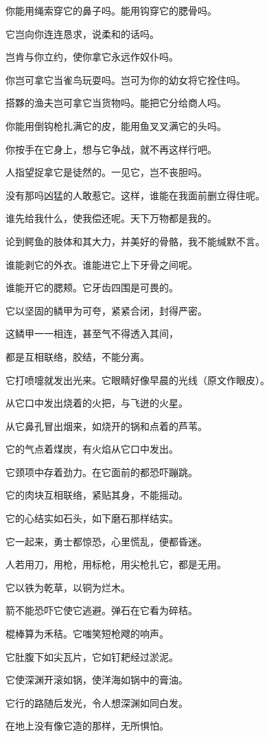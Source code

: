 \documentclass[12pt,oneside]{book}
\begin{document}
你能用绳索穿它的鼻子吗。能用钩穿它的腮骨吗。

它岂向你连连恳求，说柔和的话吗。

岂肯与你立约，使你拿它永远作奴仆吗。

你岂可拿它当雀鸟玩耍吗。岂可为你的幼女将它拴住吗。

搭夥的渔夫岂可拿它当货物吗。能把它分给商人吗。

你能用倒钩枪扎满它的皮，能用鱼叉叉满它的头吗。

你按手在它身上，想与它争战，就不再这样行吧。

人指望捉拿它是徒然的。一见它，岂不丧胆吗。

没有那吗凶猛的人敢惹它。这样，谁能在我面前删立得住呢。

谁先给我什么，使我偿还呢。天下万物都是我的。

论到鳄鱼的肢体和其大力，并美好的骨骼，我不能缄默不言。

谁能剥它的外衣。谁能进它上下牙骨之间呢。

谁能开它的腮颊。它牙齿四围是可畏的。

它以坚固的鳞甲为可夸，紧紧合闭，封得严密。

这鳞甲一一相连，甚至气不得透入其间，

都是互相联络，胶结，不能分离。

它打喷嚏就发出光来。它眼睛好像早晨的光线（原文作眼皮）。

从它口中发出烧着的火把，与飞迸的火星。

从它鼻孔冒出烟来，如烧开的锅和点着的芦苇。

它的气点着煤炭，有火焰从它口中发出。

它颈项中存着劲力。在它面前的都恐吓蹦跳。

它的肉块互相联络，紧贴其身，不能摇动。

它的心结实如石头，如下磨石那样结实。

它一起来，勇士都惊恐，心里慌乱，便都昏迷。

人若用刀，用枪，用标枪，用尖枪扎它，都是无用。

它以铁为乾草，以铜为烂木。

箭不能恐吓它使它逃避。弹石在它看为碎秸。

棍棒算为禾秸。它嗤笑短枪飕的响声。

它肚腹下如尖瓦片，它如钉耙经过淤泥。

它使深渊开滚如锅，使洋海如锅中的膏油。

它行的路随后发光，令人想深渊如同白发。

在地上没有像它造的那样，无所惧怕。
\end{document}

